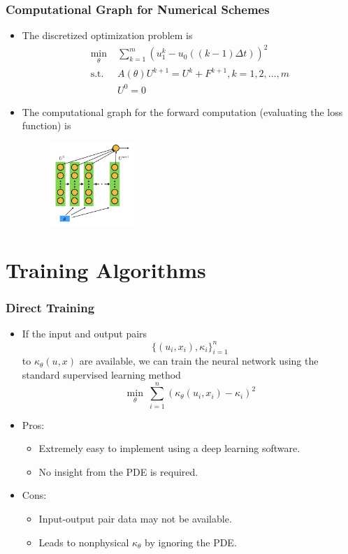 \documentclass{beamer}
\begin{document}
\begin{frame}
	\frametitle{Computational Graph for Numerical Schemes}
	
	\begin{itemize}
		\item The discretized optimization problem is 
		\begin{align*}
			\min_{\theta}& \; \sum_{k=1}^m (u^k_1 - u_0( (k-1)\Delta t))^2\\
			\text{s.t.} & \; A(\theta)U^{k+1} = U^k + F^{k+1}, k = 1, 2,\ldots, m \\
			& \; U^0 = 0
		\end{align*}
		\item The computational graph for the forward computation (evaluating the loss function) is 
		\begin{figure}[hbt]
		\centering
  \includegraphics[width=0.3\textwidth]{figures/heatcg2}
\end{figure}

	\end{itemize}
\end{frame}



\section{Training Algorithms}

\begin{frame}
	\frametitle{Direct Training}
	
	\begin{itemize}
		\item If the input and output pairs
		$$\{(u_i, x_i), \kappa_i\}_{i=1}^n$$
		to $\kappa_\theta(u,x)$ are available, we can train the neural network using the standard supervised learning method
	$$\min_\theta\ \sum_{i=1}^n (\kappa_\theta(u_i, x_i) - \kappa_i)^2$$
	\item Pros:
	\begin{itemize}
	\item Extremely easy to implement using a deep learning software. 
	\item No insight from the PDE is required.
	\end{itemize}
	\item Cons:
	\begin{itemize}
	\item Input-output pair data may not be available.
	\item Leads to nonphysical $\kappa_\theta$ by ignoring the PDE. 
	\end{itemize}
	\end{itemize}
\end{frame}
\end{document}
